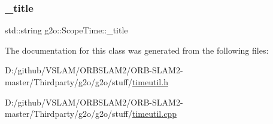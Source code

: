 \subsubsection{\texorpdfstring{\+\_\+title}{\_title}}
{\footnotesize\ttfamily std\+::string g2o\+::\+Scope\+Time\+::\+\_\+title\hspace{0.3cm}{\ttfamily [private]}}



The documentation for this class was generated from the following files\+:\begin{DoxyCompactItemize}
\item 
D\+:/github/\+V\+S\+L\+A\+M/\+O\+R\+B\+S\+L\+A\+M2/\+O\+R\+B-\/\+S\+L\+A\+M2-\/master/\+Thirdparty/g2o/g2o/stuff/\mbox{\hyperlink{timeutil_8h}{timeutil.\+h}}\item 
D\+:/github/\+V\+S\+L\+A\+M/\+O\+R\+B\+S\+L\+A\+M2/\+O\+R\+B-\/\+S\+L\+A\+M2-\/master/\+Thirdparty/g2o/g2o/stuff/\mbox{\hyperlink{timeutil_8cpp}{timeutil.\+cpp}}\end{DoxyCompactItemize}
